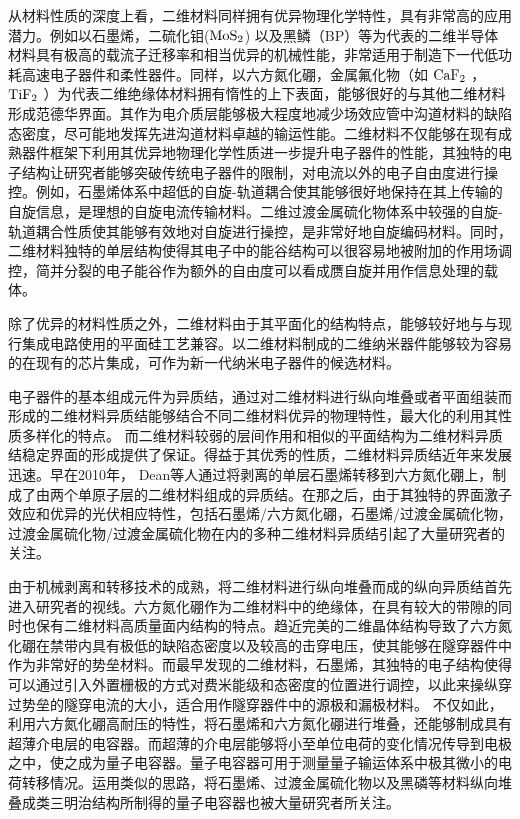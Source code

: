 从材料性质的深度上看，二维材料同样拥有优异物理化学特性，具有非常高的应用潜力。例如以石墨烯，二硫化钼($ \rm{MoS_{2}} $) 以及黑鳞（BP）等为代表的二维半导体材料具有极高的载流子迁移率和相当优异的机械性能，非常适用于制造下一代低功耗高速电子器件和柔性器件。同样，以六方氮化硼，金属氟化物（如 $ \rm{CaF_{2}} $ ， $\rm{TiF_{2}}$ ）为代表二维绝缘体材料拥有惰性的上下表面，能够很好的与其他二维材料形成范德华界面。其作为电介质层能够极大程度地减少场效应管中沟道材料的缺陷态密度，尽可能地发挥先进沟道材料卓越的输运性能。二维材料不仅能够在现有成熟器件框架下利用其优异地物理化学性质进一步提升电子器件的性能，其独特的电子结构让研究者能够突破传统电子器件的限制，对电流以外的电子自由度进行操控。例如，石墨烯体系中超低的自旋-轨道耦合使其能够很好地保持在其上传输的自旋信息，是理想的自旋电流传输材料。二维过渡金属硫化物体系中较强的自旋-轨道耦合性质使其能够有效地对自旋进行操控，是非常好地自旋编码材料。同时，二维材料独特的单层结构使得其电子中的能谷结构可以很容易地被附加的作用场调控，简并分裂的电子能谷作为额外的自由度可以看成赝自旋并用作信息处理的载体。



除了优异的材料性质之外，二维材料由于其平面化的结构特点，能够较好地与与现行集成电路使用的平面硅工艺兼容。以二维材料制成的二维纳米器件能够较为容易的在现有的芯片集成，可作为新一代纳米电子器件的候选材料。

电子器件的基本组成元件为异质结，通过对二维材料进行纵向堆叠或者平面组装而形成的二维材料异质结能够结合不同二维材料优异的物理特性，最大化的利用其性质多样化的特点。 而二维材料较弱的层间作用和相似的平面结构为二维材料异质结稳定界面的形成提供了保证。得益于其优秀的性质，二维材料异质结近年来发展迅速。早在2010年， Dean等人通过将剥离的单层石墨烯转移到六方氮化硼上，制成了由两个单原子层的二维材料组成的异质结。在那之后，由于其独特的界面激子效应和优异的光伏相应特性，包括石墨烯/六方氮化硼，石墨烯/过渡金属硫化物，过渡金属硫化物/过渡金属硫化物在内的多种二维材料异质结引起了大量研究者的关注。

由于机械剥离和转移技术的成熟，将二维材料进行纵向堆叠而成的纵向异质结首先进入研究者的视线。六方氮化硼作为二维材料中的绝缘体，在具有较大的带隙的同时也保有二维材料高质量面内结构的特点。趋近完美的二维晶体结构导致了六方氮化硼在禁带内具有极低的缺陷态密度以及较高的击穿电压，使其能够在隧穿器件中作为非常好的势垒材料。而最早发现的二维材料，石墨烯，其独特的电子结构使得可以通过引入外置栅极的方式对费米能级和态密度的位置进行调控，以此来操纵穿过势垒的隧穿电流的大小，适合用作隧穿器件中的源极和漏极材料。
不仅如此，利用六方氮化硼高耐压的特性，将石墨烯和六方氮化硼进行堆叠，还能够制成具有超薄介电层的电容器。而超薄的介电层能够将小至单位电荷的变化情况传导到电极之中，使之成为量子电容器。量子电容器可用于测量量子输运体系中极其微小的电荷转移情况。运用类似的思路，将石墨烯、过渡金属硫化物以及黑磷等材料纵向堆叠成类三明治结构所制得的量子电容器也被大量研究者所关注。

